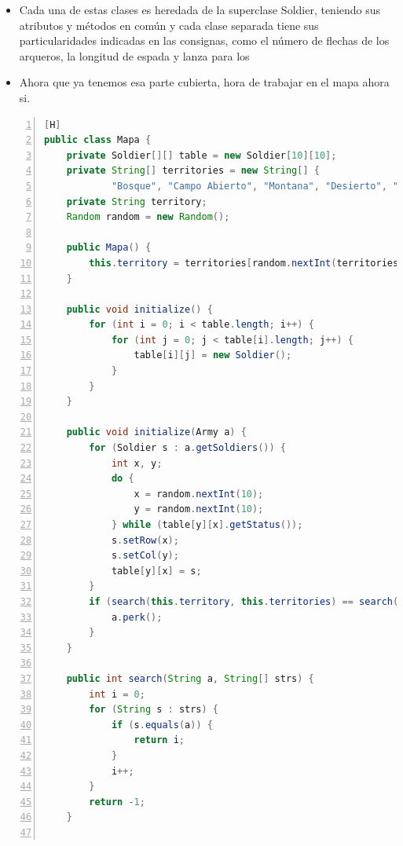\documentclass{article}
\begin{document}
	\begin{itemize}	
		\item Cada una de estas clases es heredada de la superclase Soldier, teniendo sus atributos y métodos en común y cada clase separada tiene sus particularidades indicadas en las consignas, como el número de flechas de los arqueros, la longitud de espada y lanza para los 
		\item Ahora que ya tenemos esa parte cubierta, hora de trabajar en el mapa ahora si.
	\end{itemize}
	\begin{lstlisting}[language=java,caption={Clase Mapa}, numbers=left][H]
public class Mapa {
    private Soldier[][] table = new Soldier[10][10];
    private String[] territories = new String[] {
            "Bosque", "Campo Abierto", "Montana", "Desierto", "Playa" };
    private String territory;
    Random random = new Random();

    public Mapa() {
        this.territory = territories[random.nextInt(territories.length)];
    }

    public void initialize() {
        for (int i = 0; i < table.length; i++) {
            for (int j = 0; j < table[i].length; j++) {
                table[i][j] = new Soldier();
            }
        }
    }

    public void initialize(Army a) {
        for (Soldier s : a.getSoldiers()) {
            int x, y;
            do {
                x = random.nextInt(10);
                y = random.nextInt(10);
            } while (table[y][x].getStatus());
            s.setRow(x);
            s.setCol(y);
            table[y][x] = s;
        }
        if (search(this.territory, this.territories) == search(a.getReino(), a.getReinos())) {
            a.perk();
        }
    }

    public int search(String a, String[] strs) {
        int i = 0;
        for (String s : strs) {
            if (s.equals(a)) {
                return i;
            }
            i++;
        }
        return -1;
    }


\end{lstlisting}
\end{document}
